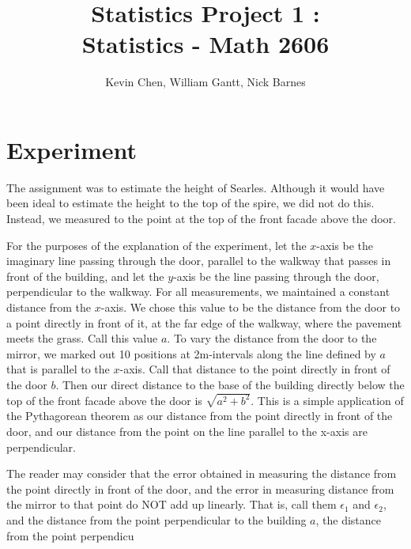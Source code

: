 \documentclass[11pt]{article}
\title{Statistics Project 1 : \\ Statistics - Math 2606}
\author{Kevin Chen, William Gantt, Nick Barnes}
\date{}
\begin{document}
\maketitle
\section{Experiment}
The assignment was to estimate the height of Searles. Although it would have been ideal to estimate the height to the top of the spire, we did not do this. Instead, we measured to the point at the top of the front facade above the door.

For the purposes of the explanation of the experiment, let the $x$-axis be the imaginary line passing through the door, parallel to the walkway that passes in front of the building, and let the $y$-axis be the line passing through the door, perpendicular to the walkway. For all measurements, we maintained a constant distance from the $x$-axis. We chose this value to be the distance from the door to a point directly in front of it, at the far edge of the walkway, where the pavement meets the grass. Call this value $a$. To vary the distance from the door to the mirror, we marked out 10 positions at 2m-intervals along the line defined by $a$ that is parallel to the $x$-axis. Call that distance to the point directly in front of the door $b$. Then our direct distance to the base of the building directly below the top of the front facade above the door is $\sqrt{a^2+b^2}$. This is a simple application of the Pythagorean theorem as our distance from the point directly in front of the door, and our distance from the point on the line parallel to the x-axis are perpendicular. 

The reader may consider that the error obtained in measuring the distance from the point directly in front of the door, and the error in measuring distance from the mirror to that point do NOT add up linearly. That is, call them $\epsilon_1$ and $\epsilon_2$, and the distance from the point perpendicular to the building $a$, the distance from the point perpendicu
\end{document}
